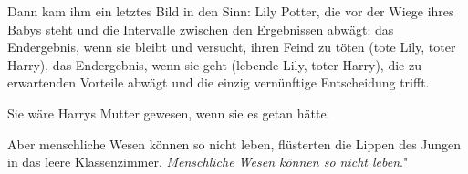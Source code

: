Dann kam ihm ein letztes Bild in den Sinn: Lily Potter, die vor der Wiege ihres
Babys steht und die Intervalle zwischen den Ergebnissen abwägt: das Endergebnis,
wenn sie bleibt und versucht, ihren Feind zu töten (tote Lily, toter Harry), das
Endergebnis, wenn sie geht (lebende Lily, toter Harry), die zu erwartenden
Vorteile abwägt und die einzig vernünftige Entscheidung trifft.

Sie wäre Harrys Mutter gewesen, wenn sie es getan hätte.

\glqq{}Aber menschliche Wesen können so nicht leben\grqq{}, flüsterten die Lippen
des Jungen in das leere Klassenzimmer. \glqq{}\emph{Menschliche Wesen können so
nicht leben}."


